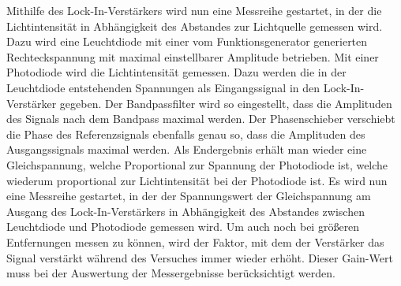 Mithilfe des Lock-In-Verstärkers wird nun eine Messreihe gestartet, in
der die Lichtintensität in Abhängigkeit des Abstandes zur Lichtquelle
gemessen wird. Dazu wird eine Leuchtdiode mit einer vom
Funktionsgenerator generierten Rechteckspannung mit maximal
einstellbarer Amplitude betrieben. Mit einer Photodiode wird die
Lichtintensität gemessen. Dazu werden die in der Leuchtdiode
entstehenden Spannungen als Eingangssignal in den Lock-In-Verstärker
gegeben. Der Bandpassfilter wird so eingestellt, dass die Amplituden des
Signals nach dem Bandpass maximal werden. Der Phasenschieber verschiebt
die Phase des Referenzsignals ebenfalls genau so, dass die Amplituden
des Ausgangssignals maximal werden. Als Endergebnis erhält man wieder
eine Gleichspannung, welche Proportional zur Spannung der Photodiode
ist, welche wiederum proportional zur Lichtintensität bei der Photodiode
ist. Es wird nun eine Messreihe gestartet, in der der Spannungswert der
Gleichspannung am Ausgang des Lock-In-Verstärkers in Abhängigkeit des
Abstandes zwischen Leuchtdiode und Photodiode gemessen wird. Um auch
noch bei größeren Entfernungen messen zu können, wird der Faktor, mit
dem der Verstärker das Signal verstärkt während des Versuches immer
wieder erhöht. Dieser Gain-Wert muss bei der Auswertung der
Messergebnisse berücksichtigt werden.
